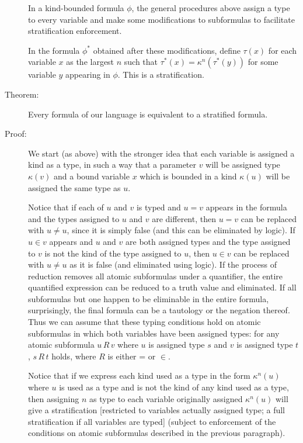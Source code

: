 \documentclass[12pt]{article}
\begin{document}
\begin{description}
In a kind-bounded formula $\phi$, the general procedures above assign a type to every variable and make some modifications to subformulas to facilitate stratification enforcement.

 In the formula
$\phi^*$ obtained after these modifications, define $\tau(x)$ for each variable $x$ as the largest $n$ such that $\tau^*(x) = \kappa^n(\tau^*(y))$ for some variable $y$ appearing in $\phi$.  This is a stratification.



\item[Theorem:]   Every formula of our language is equivalent to a stratified formula.

\item[Proof:] We start (as above) with the stronger idea that each variable is assigned a kind as a type, in such a way that a parameter $v$ will be assigned type $\kappa(v)$ and a bound variable $x$ which is bounded in a kind $\kappa(u)$ will be assigned the same type as $u$.  

Notice that if each of $u$ and $v$ is typed and $u=v$ appears in the formula and the types assigned to $u$ and $v$ are different, then $u=v$ can be replaced with $u \neq u$, since it is simply false (and this can be eliminated by logic).  If $u \in v$ appears and $u$ and $v$ are both assigned types and the type assigned to $v$ is not the kind of the type assigned to $u$, then $u \in v$ can be replaced
with $u \neq u$ as it is false (and eliminated using logic).  If the process of reduction removes all atomic subformulas under a quantifier, the entire quantified expression can be reduced to a truth value and eliminated.  If all subformulas but one happen to be eliminable in the entire formula, surprisingly, the final formula can be a tautology or the negation thereof.  Thus we can assume that these typing conditions hold on atomic subformulas in which both variables have been assigned types:  for any atomic subformula $u \, R\, v$ where $u$  is assigned type $s$ and $v$ is assigned
type $t$, $s \, R \, t$ holds, where $R$ is either = or $\in$.

Notice that if we express each kind used as a type in the form $\kappa^n(u)$ where $u$ is used as a type and is not the kind of any kind used as a type, then assigning $n$ as type to each variable originally assigned $\kappa^n(u)$ will give a stratification [restricted to variables actually assigned type;  a full stratification if all variables are typed] (subject to enforcement of the conditions on atomic subformulas described in the previous paragraph).


\end{description}
\end{document}
